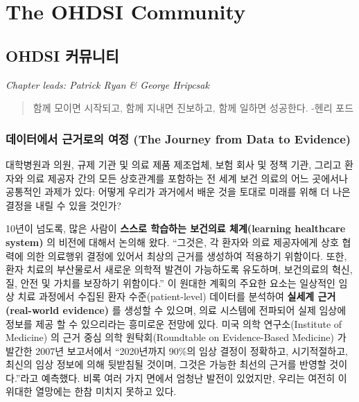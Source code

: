 \documentclass[11pt]{book}
\theoremstyle{definition}
\theoremstyle{definition}
\theoremstyle{definition}
\theoremstyle{remark}
\begin{document}
\mainmatter

\part{The OHDSI Community}\label{part-the-ohdsi-community}

\chapter{OHDSI 커뮤니티}\label{OhdsiCommunity}

\emph{Chapter leads: Patrick Ryan \& George Hripcsak}

\begin{quote}
함께 모이면 시작되고, 함께 지내면 진보하고, 함께 일하면 성공한다. -헨리
포드
\end{quote}

\section{데이터에서 근거로의 여정 (The Journey from Data to
Evidence)}\label{---the-journey-from-data-to-evidence}

대학병원과 의원, 규제 기관 및 의료 제품 제조업체, 보험 회사 및 정책
기관, 그리고 환자와 의료 제공자 간의 모든 상호관계를 포함하는 전 세계
보건 의료의 어느 곳에서나 공통적인 과제가 있다: 어떻게 우리가 과거에서
배운 것을 토대로 미래를 위해 더 나은 결정을 내릴 수 있을 것인가?

10년이 넘도록, 많은 사람이 \textbf{스스로 학습하는 보건의료
체계(learning healthcare system)} 의 비전에 대해서 논의해 왔다.
``그것은, 각 환자와 의료 제공자에게 상호 협력에 의한 의료행위 결정에
있어서 최상의 근거를 생성하여 적용하기 위함이다. 또한, 환자 치료의
부산물로서 새로운 의학적 발견이 가능하도록 유도하며, 보건의료의 혁신,
질, 안전 및 가치를 보장하기 위함이다.'' \citep{olsen2007learning} 이
원대한 계획의 주요한 요소는 일상적인 임상 치료 과정에서 수집된 환자
수준(patient-level) 데이터를 분석하여 \textbf{실세계 근거(real-world
evidence)} 를 생성할 수 있으며, 의료 시스템에 전파되어 실제 임상에
정보를 제공 할 수 있으리라는 흥미로운 전망에 있다. 미국 의학
연구소(Institute of Medicine) 의 근거 중심 의학 원탁회(Roundtable on
Evidence-Based Medicine) 가 발간한 2007년 보고서에서 ``2020년까지 90\%의
임상 결정이 정확하고, 시기적절하고, 최신의 임상 정보에 의해 뒷받침될
것이며, 그것은 가능한 최선의 근거를 반영할 것이다.''라고 예측했다.
\citep{olsen2007learning} 비록 여러 가지 면에서 엄청난 발전이 있었지만,
우리는 여전히 이 위대한 열망에는 한참 미치지 못하고 있다.
\end{document}
